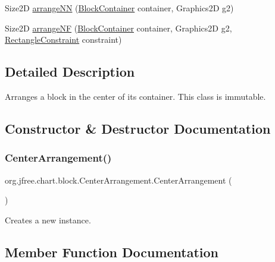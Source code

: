 \begin{DoxyCompactItemize}
\item 
Size2D \mbox{\hyperlink{classorg_1_1jfree_1_1chart_1_1block_1_1_center_arrangement_ab06ae58eea6269b11deaa33ecde575c9}{arrange\+NN}} (\mbox{\hyperlink{classorg_1_1jfree_1_1chart_1_1block_1_1_block_container}{Block\+Container}} container, Graphics2D g2)
\item 
Size2D \mbox{\hyperlink{classorg_1_1jfree_1_1chart_1_1block_1_1_center_arrangement_a55617f6d0fc7313c7ee186a30e41337a}{arrange\+NF}} (\mbox{\hyperlink{classorg_1_1jfree_1_1chart_1_1block_1_1_block_container}{Block\+Container}} container, Graphics2D g2, \mbox{\hyperlink{classorg_1_1jfree_1_1chart_1_1block_1_1_rectangle_constraint}{Rectangle\+Constraint}} constraint)
\end{DoxyCompactItemize}


\subsection{Detailed Description}
Arranges a block in the center of its container. This class is immutable. 

\subsection{Constructor \& Destructor Documentation}
\mbox{\label{classorg_1_1jfree_1_1chart_1_1block_1_1_center_arrangement_ac96aab411234cc7c72a1a7ba82d57377}} 
\subsubsection{\texorpdfstring{Center\+Arrangement()}{CenterArrangement()}}
{\footnotesize\ttfamily org.\+jfree.\+chart.\+block.\+Center\+Arrangement.\+Center\+Arrangement (\begin{DoxyParamCaption}{ }\end{DoxyParamCaption})}

Creates a new instance. 

\subsection{Member Function Documentation}
\mbox{\label{classorg_1_1jfree_1_1chart_1_1block_1_1_center_arrangement_a4de4c495b559a726ab4cff17f154ab81}} 
